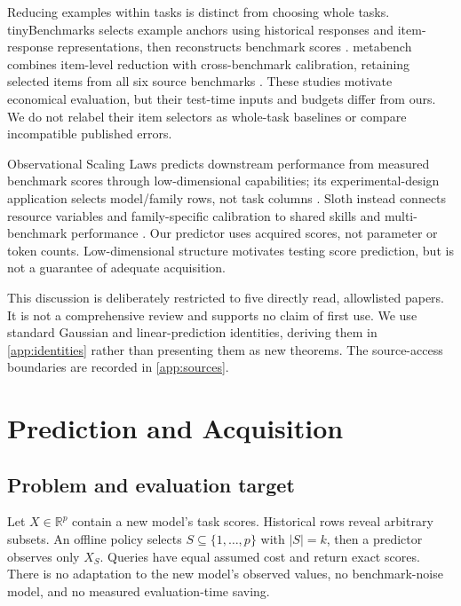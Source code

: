 \documentclass{article}
\begin{document}
Reducing examples within tasks is distinct from choosing whole tasks. tinyBenchmarks selects example anchors using historical responses and item-response representations, then reconstructs benchmark scores \citep{polo2024tinybenchmarks}. metabench combines item-level reduction with cross-benchmark calibration, retaining selected items from all six source benchmarks \citep{kipnis2024metabench}. These studies motivate economical evaluation, but their test-time inputs and budgets differ from ours. We do not relabel their item selectors as whole-task baselines or compare incompatible published errors.

Observational Scaling Laws predicts downstream performance from measured benchmark scores through low-dimensional capabilities; its experimental-design application selects model/family rows, not task columns \citep{ruan2024observational}. Sloth instead connects resource variables and family-specific calibration to shared skills and multi-benchmark performance \citep{polo2024sloth}. Our predictor uses acquired scores, not parameter or token counts. Low-dimensional structure motivates testing score prediction, but is not a guarantee of adequate acquisition.

This discussion is deliberately restricted to five directly read, allowlisted papers. It is not a comprehensive review and supports no claim of first use. We use standard Gaussian and linear-prediction identities, deriving them in \cref{app:identities} rather than presenting them as new theorems. The source-access boundaries are recorded in \cref{app:sources}.

\section{Prediction and Acquisition}
\label{sec:method}
\subsection{Problem and evaluation target}
Let $X\in\mathbb{R}^p$ contain a new model's task scores. Historical rows reveal arbitrary subsets. An offline policy selects $S\subseteq\{1,\ldots,p\}$ with $|S|=k$, then a predictor observes only $X_S$. Queries have equal assumed cost and return exact scores. There is no adaptation to the new model's observed values, no benchmark-noise model, and no measured evaluation-time saving.
\end{document}
